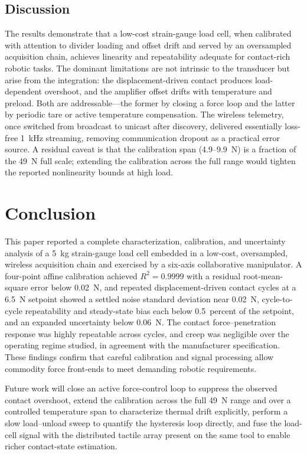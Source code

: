\documentclass[conference]{IEEEtran}
\begin{document}
\subsection{Discussion}
The results demonstrate that a low-cost strain-gauge load cell, when calibrated with attention to divider loading and offset drift and served by an oversampled acquisition chain, achieves linearity and repeatability adequate for contact-rich robotic tasks. The dominant limitations are not intrinsic to the transducer but arise from the integration: the displacement-driven contact produces load-dependent overshoot, and the amplifier offset drifts with temperature and preload. Both are addressable---the former by closing a force loop and the latter by periodic tare or active temperature compensation. The wireless telemetry, once switched from broadcast to unicast after discovery, delivered essentially loss-free 1~kHz streaming, removing communication dropout as a practical error source. A residual caveat is that the calibration span (4.9--9.9~N) is a fraction of the 49~N full scale; extending the calibration across the full range would tighten the reported nonlinearity bounds at high load.

\section{Conclusion}\label{sec:conclusion}
This paper reported a complete characterization, calibration, and uncertainty analysis of a 5~kg strain-gauge load cell embedded in a low-cost, oversampled, wireless acquisition chain and exercised by a six-axis collaborative manipulator. A four-point affine calibration achieved $R^{2}=0.9999$ with a residual root-mean-square error below 0.02~N, and repeated displacement-driven contact cycles at a 6.5~N setpoint showed a settled noise standard deviation near 0.02~N, cycle-to-cycle repeatability and steady-state bias each below 0.5~percent of the setpoint, and an expanded uncertainty below 0.06~N. The contact force--penetration response was highly repeatable across cycles, and creep was negligible over the operating regime studied, in agreement with the manufacturer specification. These findings confirm that careful calibration and signal processing allow commodity force front-ends to meet demanding robotic requirements.

Future work will close an active force-control loop to suppress the observed contact overshoot, extend the calibration across the full 49~N range and over a controlled temperature span to characterize thermal drift explicitly, perform a slow load--unload sweep to quantify the hysteresis loop directly, and fuse the load-cell signal with the distributed tactile array present on the same tool to enable richer contact-state estimation.
\end{document}
